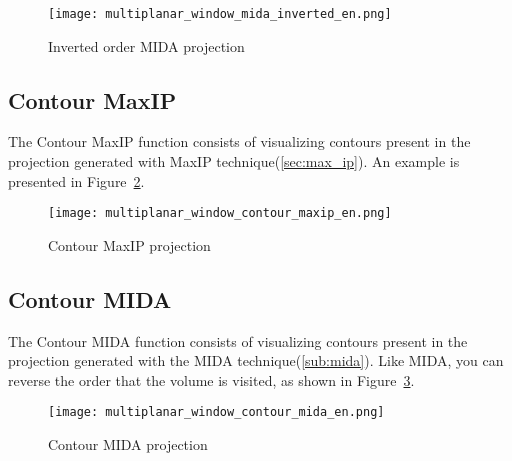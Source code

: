 \begin{figure}[!h]
\centering
\texttt{[image: multiplanar\_window\_mida\_inverted\_en.png]}
\caption{Inverted order MIDA projection}
\label{fig:proj_MIDA_inv}
\end{figure}

\subsection{Contour MaxIP}

The Contour MaxIP function consists of visualizing contours present in the projection generated with MaxIP technique(\ref{sec:max_ip}). An example is presented in Figure~\ref{fig:proj_contorno_maxip}.

\begin{figure}[!h]
\centering
\texttt{[image: multiplanar\_window\_contour\_maxip\_en.png]}
\caption{Contour MaxIP projection}
\label{fig:proj_contorno_maxip}
\end{figure}

\subsection{Contour MIDA}

The Contour MIDA function consists of visualizing contours present in the projection generated with the MIDA technique(\ref{sub:mida}). Like MIDA, you can reverse the order that the volume is visited, as shown in Figure~\ref{fig:proj_contorno_mida}.

\begin{figure}[!h]
\centering
\texttt{[image: multiplanar\_window\_contour\_mida\_en.png]}
\caption{Contour MIDA projection}
\label{fig:proj_contorno_mida}
\end{figure}
